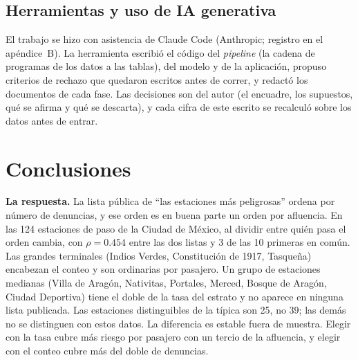 \documentclass[conference]{IEEEtran}
\begin{document}
\subsection{Herramientas y uso de IA generativa}

El trabajo se hizo con asistencia de Claude Code (Anthropic; registro en el apéndice~B). La herramienta escribió el código del \emph{pipeline} (la cadena de programas de los datos a las tablas), del modelo y de la aplicación, propuso criterios de rechazo que quedaron escritos antes de correr, y redactó los documentos de cada fase. Las decisiones son del autor (el encuadre, los supuestos, qué se afirma y qué se descarta), y cada cifra de este escrito se recalculó sobre los datos antes de entrar.

\section{Conclusiones}

\textbf{La respuesta.} La lista pública de ``las estaciones más peligrosas'' ordena por número de denuncias, y ese orden es en buena parte un orden por afluencia. En las 124 estaciones de paso de la Ciudad de México, al dividir entre quién pasa el orden cambia, con $\rho = 0.454$ entre las dos listas y 3 de las 10 primeras en común. Las grandes terminales (Indios Verdes, Constitución de 1917, Tasqueña) encabezan el conteo y son ordinarias por pasajero. Un grupo de estaciones medianas (Villa de Aragón, Nativitas, Portales, Merced, Bosque de Aragón, Ciudad Deportiva) tiene el doble de la tasa del estrato y no aparece en ninguna lista publicada. Las estaciones distinguibles de la típica son 25, no 39; las demás no se distinguen con estos datos. La diferencia es estable fuera de muestra. Elegir con la tasa cubre más riesgo por pasajero con un tercio de la afluencia, y elegir con el conteo cubre más del doble de denuncias.
\end{document}

